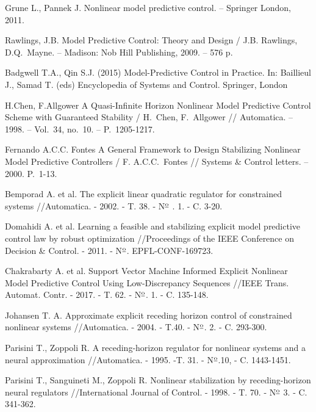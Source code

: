 \begin{biblio}

Grune L., Pannek J. Nonlinear model predictive control. -- Springer London, 2011.

Rawlings, J.B. Model Predictive Control: Theory and Design / J.B. Rawlings, D.Q.~Mayne. -- Madison:
Nob Hill Publishing, 2009. -- 576 p.

Badgwell T.A., Qin S.J. (2015) Model-Predictive Control in Practice. In: Baillieul J., Samad T. (eds) Encyclopedia of Systems and Control. Springer, London

H.Chen, F.Allgower A Quasi-Infinite Horizon Nonlinear Model Predictive Control Scheme with Guaranteed Stability /  H.~Chen,  F.~Allgower  //
Automatica. -- 1998. -- Vol.~34, no.~10. -- P.~1205-1217.

Fernando A.C.C. Fontes A General Framework to Design Stabilizing Nonlinear Model Predictive Controllers / F. A.C.C.~Fontes // Systems \& Control letters.  -- 2000.  P.~1-13.

Bemporad A. et al. The explicit linear quadratic regulator for constrained systems //Automatica. - 2002. - T. 38. - N$\textsuperscript{\underline{o}}$ . 1. - C. 3-20.

Domahidi A. et al. Learning a feasible and stabilizing explicit model predictive control law by robust optimization //Proceedings of the IEEE Conference on Decision \& Control. - 2011. - N$\textsuperscript{\underline{o}}$. EPFL-CONF-169723.

Chakrabarty A. et al. Support Vector Machine Informed Explicit Nonlinear Model Predictive Control Using Low-Discrepancy Sequences //IEEE Trans. Automat. Contr. - 2017. - T. 62. - N$\textsuperscript{\underline{o}}$. 1. - C. 135-148.

Johansen T. A. Approximate explicit receding horizon control of constrained nonlinear systems //Automatica.  - 2004. - T.40. - N$\textsuperscript{\underline{o}}$. 2. - C. 293-300.

Parisini T., Zoppoli R. A receding-horizon regulator for nonlinear systems and a neural approximation //Automatica. - 1995. -T. 31. - N$\textsuperscript{\underline{o}}$.10, - C. 1443-1451.

Parisini T., Sanguineti M., Zoppoli R. Nonlinear stabilization by receding-horizon neural regulators //International Journal of Control. - 1998. - T. 70. - N$\textsuperscript{\underline{o}}$ 3. - C. 341-362.


\end{biblio}
